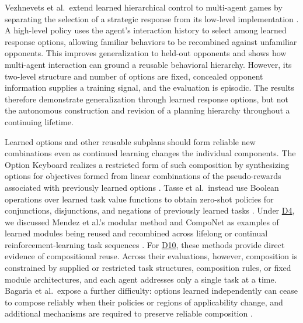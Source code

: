 \documentclass[10pt,journal,compsoc]{IEEEtran}
\DeclareRobustCommand{\Dref}[1]{\hyperref[sec:d#1]{D#1}}
\begin{document}
Vezhnevets et al.\ extend learned hierarchical control to multi-agent games by separating the selection of a strategic response from its low-level implementation \cite{vezhnevets2020}.
A high-level policy uses the agent's interaction history to select among learned response options, allowing familiar behaviors to be recombined against unfamiliar opponents.
This improves generalization to held-out opponents and shows how multi-agent interaction can ground a reusable behavioral hierarchy.
However, its two-level structure and number of options are fixed, concealed opponent information supplies a training signal, and the evaluation is episodic.
The results therefore demonstrate generalization through learned response options, but not the autonomous construction and revision of a planning hierarchy throughout a continuing lifetime.

Learned options and other reusable subplans should form reliable new combinations even as continued learning changes the individual components.
The Option Keyboard realizes a restricted form of such composition by synthesizing options for objectives formed from linear combinations of the pseudo-rewards associated with previously learned options \cite{barreto2019}.
Tasse et al.\ instead use Boolean operations over learned task value functions to obtain zero-shot policies for conjunctions, disjunctions, and negations of previously learned tasks \cite{tasse2022}.
Under \Dref{4}, we discussed Mendez et al.'s modular method and CompoNet as examples of learned modules being reused and recombined across lifelong or continual reinforcement-learning task sequences \cite{mendez2022b,malagon2024}.
For \Dref{10}, these methods provide direct evidence of compositional reuse.
Across their evaluations, however, composition is constrained by supplied or restricted task structures, composition rules, or fixed module architectures, and each agent addresses only a single task at a time.
Bagaria et al.\ expose a further difficulty: options learned independently can cease to compose reliably when their policies or regions of applicability change, and additional mechanisms are required to preserve reliable composition \cite{bagaria2021}.
\end{document}
